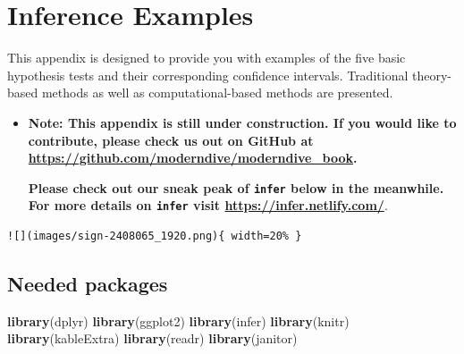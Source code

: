 \documentclass[12pt, krantz2,]{krantz}
\makeatletter
\newenvironment{Shaded}{\begin{snugshade}}{\end{snugshade}}
\newcommand{\DataTypeTok}[1]{\textcolor[rgb]{0.27,0.27,0.27}{#1}}
\newcommand{\KeywordTok}[1]{\textcolor[rgb]{0.27,0.27,0.27}{\textbf{#1}}}
\newcommand{\NormalTok}[1]{#1}
\newcommand{\StringTok}[1]{\textcolor[rgb]{0.5,0.5,0.5}{#1}}
\newenvironment{kframe}{%
\medskip{}
\setlength{\fboxsep}{.8em}
 \def\at@end@of@kframe{}%
 \ifinner\ifhmode%
  \def\at@end@of@kframe{\end{minipage}}%
  \begin{minipage}{\columnwidth}%
 \fi\fi%
 \def\FrameCommand##1{\hskip\@totalleftmargin \hskip-\fboxsep
 \colorbox{shadecolor}{##1}\hskip-\fboxsep
     \hskip-\linewidth \hskip-\@totalleftmargin \hskip\columnwidth}%
 \MakeFramed {\advance\hsize-\width
   \@totalleftmargin\z@ \linewidth\hsize
   \@setminipage}}%
 {\par\unskip\endMakeFramed%
 \at@end@of@kframe}
\renewenvironment{Shaded}{\begin{kframe}}{\end{kframe}}
\newenvironment{rmdblock}[1]
  {\begin{shaded*}
  \begin{itemize}
  \renewcommand{\labelitemi}{
    \raisebox{-.7\height}[0pt][0pt]{
    }
  }
  \item
  }
  {
  \end{itemize}
  \end{shaded*}
  }
\newenvironment{learncheck}
  {\begin{rmdblock}{warning}}
  {\end{rmdblock}}
\makeatother
\begin{document}
\hypertarget{appendixB}{%
\chapter{Inference Examples}\label{appendixB}}

This appendix is designed to provide you with examples of the five basic hypothesis tests and their corresponding confidence intervals. Traditional theory-based methods as well as computational-based methods are presented.

\begin{learncheck}
\textbf{Note: This appendix is still under construction. If you would
like to contribute, please check us out on GitHub at
\url{https://github.com/moderndive/moderndive_book}.}

\textbf{Please check out our sneak peak of \texttt{infer} below in the
meanwhile. For more details on \texttt{infer} visit
\url{https://infer.netlify.com/}}.
\end{learncheck}

\begin{Shaded}
\end{Shaded}

\begin{verbatim}
![](images/sign-2408065_1920.png){ width=20% }
\end{verbatim}

\hypertarget{needed-packages-10}{%
\section*{Needed packages}\label{needed-packages-10}}


\begin{Shaded}
\begin{Highlighting}[]
\KeywordTok{library}\NormalTok{(dplyr)}
\KeywordTok{library}\NormalTok{(ggplot2)}
\KeywordTok{library}\NormalTok{(infer)}
\KeywordTok{library}\NormalTok{(knitr)}
\KeywordTok{library}\NormalTok{(kableExtra)}
\KeywordTok{library}\NormalTok{(readr)}
\KeywordTok{library}\NormalTok{(janitor)}
\end{Highlighting}
\end{Shaded}
\end{document}
